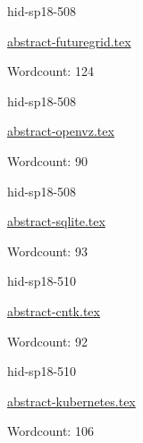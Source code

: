 

\begin{IU}

hid-sp18-508

\href{https://github.com/cloudmesh-community/hid-sp18-508/blob/master//technology/abstract-futuregrid.tex}{abstract-futuregrid.tex}

 

Wordcount: 124

\end{IU}



\begin{IU}

hid-sp18-508

\href{https://github.com/cloudmesh-community/hid-sp18-508/blob/master//technology/abstract-openvz.tex}{abstract-openvz.tex}

 

Wordcount: 90

\end{IU}



\begin{IU}

hid-sp18-508

\href{https://github.com/cloudmesh-community/hid-sp18-508/blob/master//technology/abstract-sqlite.tex}{abstract-sqlite.tex}

 

Wordcount: 93

\end{IU}



\begin{IU}

hid-sp18-510

\href{https://github.com/cloudmesh-community/hid-sp18-510/blob/master//technology/abstract-cntk.tex}{abstract-cntk.tex}

 

Wordcount: 92

\end{IU}



\begin{IU}

hid-sp18-510

\href{https://github.com/cloudmesh-community/hid-sp18-510/blob/master//technology/abstract-kubernetes.tex}{abstract-kubernetes.tex}

 

Wordcount: 106

\end{IU}

